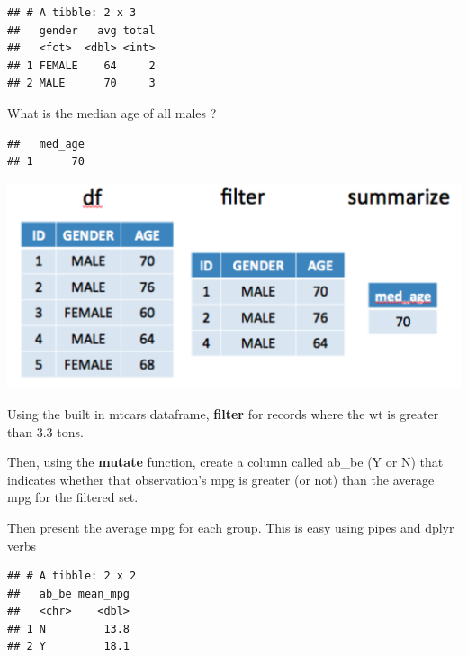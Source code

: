 \documentclass[]{book}
\newenvironment{Shaded}{\begin{snugshade}}{\end{snugshade}}
\newcommand{\DataTypeTok}[1]{\textcolor[rgb]{0.13,0.29,0.53}{#1}}
\newcommand{\FloatTok}[1]{\textcolor[rgb]{0.00,0.00,0.81}{#1}}
\newcommand{\KeywordTok}[1]{\textcolor[rgb]{0.13,0.29,0.53}{\textbf{#1}}}
\newcommand{\NormalTok}[1]{#1}
\newcommand{\OperatorTok}[1]{\textcolor[rgb]{0.81,0.36,0.00}{\textbf{#1}}}
\newcommand{\StringTok}[1]{\textcolor[rgb]{0.31,0.60,0.02}{#1}}
\begin{document}
\begin{verbatim}
## # A tibble: 2 x 3
##   gender   avg total
##   <fct>  <dbl> <int>
## 1 FEMALE    64     2
## 2 MALE      70     3
\end{verbatim}

What is the median age of all males ?

\begin{Shaded}
\end{Shaded}

\begin{verbatim}
##   med_age
## 1      70
\end{verbatim}

\includegraphics{./figures/chrt.png}

Using the built in mtcars dataframe, \textbf{filter} for records where the wt is greater than 3.3 tons.

Then, using the \textbf{mutate} function, create a column called ab\_be (Y or N) that indicates whether that observation's mpg is greater (or not) than the average mpg for the filtered set.

Then present the average mpg for each group. This is easy using pipes and dplyr verbs

\begin{Shaded}
\end{Shaded}

\begin{verbatim}
## # A tibble: 2 x 2
##   ab_be mean_mpg
##   <chr>    <dbl>
## 1 N         13.8
## 2 Y         18.1
\end{verbatim}


\end{document}
